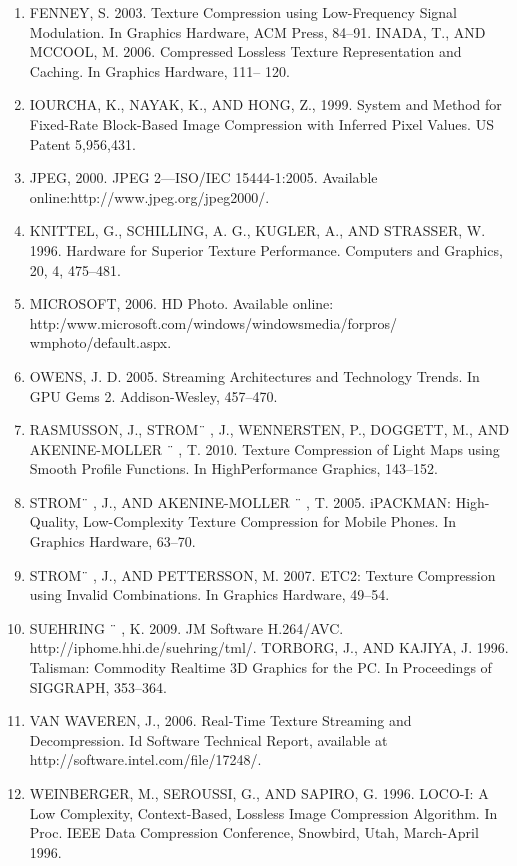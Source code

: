 \documentclass{article}
\begin{document}
\begin{enumerate}
	\item FENNEY, S. 2003. Texture Compression using Low-Frequency
	Signal Modulation. In Graphics Hardware, ACM Press, 84–91.
	INADA, T., AND MCCOOL, M. 2006. Compressed Lossless Texture Representation and Caching. In Graphics Hardware, 111–	120.

	\item IOURCHA, K., NAYAK, K., AND HONG, Z., 1999. System and
	Method for Fixed-Rate Block-Based Image Compression with
	Inferred Pixel Values. US Patent 5,956,431.	
	
	\item JPEG, 2000. JPEG 2—ISO/IEC 15444-1:2005. Available online:http://www.jpeg.org/jpeg2000/.
	
	\item KNITTEL, G., SCHILLING, A. G., KUGLER, A., AND STRASSER, W. 1996. Hardware for Superior Texture Performance. Computers and Graphics, 20, 4, 475–481.
	
	\item MICROSOFT, 2006. HD Photo. Available online:
	http:/www.microsoft.com/windows/windowsmedia/forpros/
	wmphoto/default.aspx.

	\item OWENS, J. D. 2005. Streaming Architectures and Technology
	Trends. In GPU Gems 2. Addison-Wesley, 457–470.

	\item RASMUSSON, J., STROM¨ , J., WENNERSTEN, P., DOGGETT,
	M., AND AKENINE-MOLLER ¨ , T. 2010. Texture Compression of Light Maps using Smooth Profile Functions. In HighPerformance Graphics, 143–152.

	\item STROM¨ , J., AND AKENINE-MOLLER ¨ , T. 2005. iPACKMAN:
	High-Quality, Low-Complexity Texture Compression for Mobile Phones. In Graphics Hardware, 63–70.
	\item STROM¨ , J., AND PETTERSSON, M. 2007. ETC2: Texture Compression using Invalid Combinations. In Graphics Hardware,
	49–54.
	
	\item SUEHRING ¨ , K. 2009. JM Software H.264/AVC.
	http://iphome.hhi.de/suehring/tml/.
	TORBORG, J., AND KAJIYA, J. 1996. Talisman: Commodity Realtime 3D Graphics for the PC. In Proceedings of SIGGRAPH,
	353–364.
	
	\item VAN WAVEREN, J., 2006. Real-Time Texture Streaming and
	Decompression. Id Software Technical Report, available at
	http://software.intel.com/file/17248/.
	\item WEINBERGER, M., SEROUSSI, G., AND SAPIRO, G. 1996.
	LOCO-I: A Low Complexity, Context-Based, Lossless Image
	Compression Algorithm. In Proc. IEEE Data Compression Conference, Snowbird, Utah, March-April 1996.
	

\end{enumerate}
\end{document}
